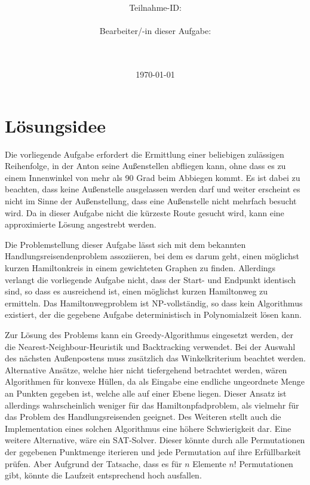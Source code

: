 \documentclass[a4paper,10pt,ngerman]{scrartcl}
\title{\textbf{\Huge\Aufgabe}}
\author{\LARGE Teilnahme-ID: \LARGE \TeilnahmeId \\\\
\LARGE Bearbeiter/-in dieser Aufgabe: \\
\LARGE \Name\\\\}
\date{\LARGE\today}
\begin{document}
    \maketitle
    \tableofcontents
    \vspace{0.5cm}
    \newpage


    \section{Lösungsidee}\label{sec:losungsidee}

    Die vorliegende Aufgabe erfordert die Ermittlung einer beliebigen zulässigen Reihenfolge,
    in der Anton seine Außenstellen abfliegen kann,
    ohne dass es zu einem Innenwinkel von mehr als 90 Grad beim Abbiegen kommt.
    Es ist dabei zu beachten, dass keine Außenstelle ausgelassen werden darf
    und weiter erscheint es nicht im Sinne der Außenstellung, dass eine Außenstelle nicht mehrfach besucht wird.
    Da in dieser Aufgabe nicht die kürzeste Route gesucht wird, kann eine approximierte Lösung angestrebt werden.

    Die Problemstellung dieser Aufgabe lässt sich mit dem bekannten Handlungsreisendenproblem assoziieren,
    bei dem es darum geht, einen möglichst kurzen Hamiltonkreis in einem gewichteten Graphen zu finden.
    Allerdings verlangt die vorliegende Aufgabe nicht, dass der Start- und Endpunkt identisch sind,
    so dass es ausreichend ist, einen möglichst kurzen Hamiltonweg zu ermitteln.
    Das Hamiltonwegproblem ist NP-vollständig, so dass kein Algorithmus existiert,
    der die gegebene Aufgabe deterministisch in Polynomialzeit lösen kann.

    Zur Lösung des Problems kann ein Greedy-Algorithmus eingesetzt werden,
    der die Nearest-Neighbour-Heuristik und Backtracking verwendet.
    Bei der Auswahl des nächsten Außenpostens muss zusätzlich das Winkelkriterium beachtet werden.
    Alternative Ansätze, welche hier nicht tiefergehend betrachtet werden, wären Algorithmen für konvexe Hüllen,
    da als Eingabe eine endliche ungeordnete Menge an Punkten gegeben ist, welche alle auf einer Ebene liegen.
    Dieser Ansatz ist allerdings wahrscheinlich weniger für das Hamiltonpfadproblem,
    als vielmehr für das Problem des Handlungsreisenden geeignet.
    Des Weiteren stellt auch die Implementation eines solchen Algorithmus eine höhere Schwierigkeit dar.
    Eine weitere Alternative, wäre ein SAT-Solver.
    Dieser könnte durch alle Permutationen der gegebenen Punktmenge iterieren
    und jede Permutation auf ihre Erfüllbarkeit prüfen.
    Aber Aufgrund der Tatsache, dass es für $n$ Elemente $n!$ Permutationen gibt,
    könnte die Laufzeit entsprechend hoch ausfallen.
\end{document}

